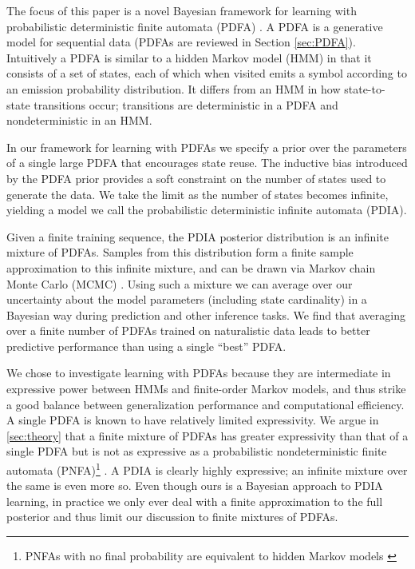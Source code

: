 The focus of this paper is a novel Bayesian framework for learning with probabilistic deterministic finite automata (PDFA) \cite{Rabin1963}.  A PDFA is a generative model for sequential data (PDFAs are reviewed in  Section \ref{sec:PDFA}).  Intuitively a PDFA is similar to a hidden Markov model (HMM) \cite{Rabiner1989} in that it consists of a set of states, each of which when visited emits a symbol according to an emission probability distribution.  It differs from an HMM in how state-to-state transitions occur; transitions are deterministic in a PDFA and nondeterministic in an HMM.  

In our framework for learning with PDFAs we specify a prior over the parameters of a single large PDFA that encourages state reuse.  The inductive bias introduced by the PDFA prior provides a soft constraint on the number of states used to generate the data.  We take the limit as the number of states becomes infinite, yielding a model we call the probabilistic deterministic infinite automata (PDIA).  

Given a finite training sequence, the PDIA posterior distribution is an infinite mixture of PDFAs.  Samples from this distribution form a finite sample approximation to this infinite mixture, and can be drawn via Markov chain Monte Carlo (MCMC) \cite{Gelman1995}.  Using such a mixture we can average over our uncertainty about the model parameters (including state cardinality) in a Bayesian way during prediction and other inference tasks.  We find that averaging over a finite number of PDFAs trained on naturalistic data leads to better predictive performance than using a single ``best'' PDFA.  

We chose to investigate learning with PDFAs because they are intermediate in expressive power between HMMs and finite-order Markov models, and thus strike a good balance between generalization performance and computational efficiency.  A single PDFA is known to have relatively limited expressivity.  We argue in \ref{sec:theory} that a finite mixture of PDFAs has greater expressivity than that of a single PDFA but is not as expressive as a probabilistic nondeterministic finite automata (PNFA)\footnote{PNFAs with no final probability are equivalent to hidden Markov models \cite{Dupont2005} \label{fn:pnfa}} .  A PDIA is clearly highly expressive; an infinite mixture over the same is even more so.  Even though ours is a Bayesian approach to PDIA learning, in practice we only ever deal with a finite approximation to the full posterior and thus limit our discussion to finite mixtures of PDFAs.


